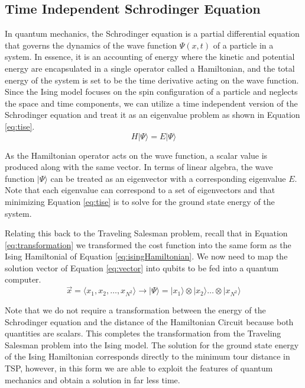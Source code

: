 \subsection{Time Independent Schrodinger Equation}
In quantum mechanics, the Schrodinger equation is a partial differential equation that governs the dynamics of the wave function $\Psi(x,t)$ of a particle in a system. 
In essence, it is an accounting of energy where the kinetic and potential energy are encapsulated in a single operator called a Hamiltonian, and the total energy of the system is set to be the time derivative acting on the wave function. 
Since the Ising model focuses on the spin configuration of a particle and neglects the space and time components, we can utilize a time independent version of the Schrodinger equation and treat it as an eigenvalue problem as shown in Equation \ref{eq:tise}. 
\begin{equation}
	H | \Psi \rangle = E | \Psi \rangle
	\label{eq:tise}
\end{equation}

As the Hamiltonian operator acts on the wave function, a scalar value is produced along with the same vector. 
In terms of linear algebra, the wave function $| \Psi \rangle$ can be treated as an eigenvector with a corresponding eigenvalue $E$. 
Note that each eigenvalue can correspond to a set of eigenvectors and that minimizing Equation \ref{eq:tise} is to solve for the ground state energy of the system. 

Relating this back to the Traveling Salesman problem, recall that in Equation \ref{eq:transformation} we transformed the cost function into the same form as the Ising Hamiltonial of Equation \ref{eq:isingHamiltonian}. We now need to map the solution vector of Equation \ref{eq:vector} into qubits to be fed into a quantum computer. 
\begin{equation}
	\vec{x} = \langle x_1, x_2, \dots, x_{N^2} \rangle \rightarrow |\Psi\rangle = |x_1\rangle \otimes |x_2\rangle \dots \otimes  |x_{N^2}\rangle 
\end{equation}

Note that we do not require a transformation between the energy of the Schrodinger equation and the distance of the Hamiltonian Circuit because both quantities are scalars. This completes the transformation from the Traveling Salesman problem into the Ising model. The solution for the ground state energy of the Ising Hamiltonian corresponds directly to the minimum tour distance in TSP, however, in this form we are able to exploit the features of quantum mechanics and obtain a solution in far less time. 